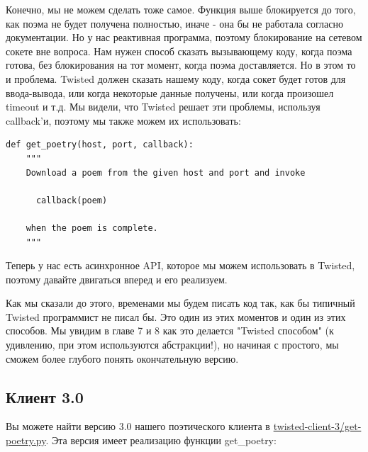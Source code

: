 Конечно, мы не можем сделать тоже самое. 
Функция выше блокируется до того, как поэма не 
будет получена полностью, иначе - она бы не работала 
согласно документации. Но у нас 
реактивная программа, поэтому блокирование на сетевом сокете 
вне вопроса. Нам нужен способ сказать вызывающему коду, 
когда поэма готова, без блокирования на тот момент, когда 
поэма доставляется. Но в этом то и проблема. 
Twisted должен сказать нашему коду, 
когда сокет будет готов для ввода-вывода, или когда 
некоторые данные получены, или когда произошел timeout и т.д. 
Мы видели, что Twisted решает эти проблемы, используя 
callback'и, поэтому мы также можем их использовать:

\begin{scriptsize}\begin{verbatim}
def get_poetry(host, port, callback):
    """
    Download a poem from the given host and port and invoke

      callback(poem)

    when the poem is complete.
    """
\end{verbatim}\end{scriptsize}


Теперь у нас есть асинхронное API, которое мы можем использовать 
в Twisted, поэтому давайте двигаться вперед и его реализуем.


Как мы сказали до этого, временами мы будем писать код 
так, как бы типичный Twisted программист не писал бы. 
Это один из этих моментов и один из этих способов. Мы увидим в
главе 7 и 8 как это делается "Twisted способом" (к удивлению, 
при этом используются абстракции!), но начиная с простого, мы сможем 
более глубого понять окончательную версию.


\subsection{Клиент 3.0}

Вы можете найти версию 3.0 нашего поэтического 
клиента в 
\href{http://github.com/jdavisp3/twisted-intro/blob/master/twisted-client-3/get-poetry.py}{twisted-client-3/get-poetry.py}. 
Эта версия имеет реализацию функции get\_poetry:

